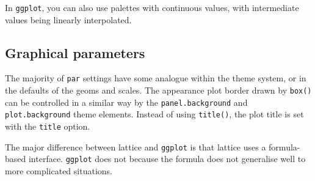 In \texttt{ggplot}, you can also use palettes with continuous values,
with intermediate values being linearly interpolated.

\begin{Shaded}
\begin{Highlighting}[]
\NormalTok{(}\NormalTok{:}\NormalTok{, }\NormalTok{:}\NormalTok{, } \NormalTok{:}\NormalTok{, } \NormalTok{(}\NormalTok{)) +}
\StringTok{  }\NormalTok{(} \NormalTok{(}\NormalTok{))}
\NormalTok{() +}
\StringTok{  }\NormalTok{(} \NormalTok{(}\NormalTok{))}
\end{Highlighting}
\end{Shaded}

\subsection{Graphical parameters}

The majority of \texttt{par} settings have some analogue within the
theme system, or in the defaults of the geoms and scales. The appearance
plot border drawn by \texttt{box()} can be controlled in a similar way
by the \texttt{panel.background} and \texttt{plot.background} theme
elements. Instead of using \texttt{title()}, the plot title is set with
the \texttt{title} option.


The major difference between lattice and \texttt{ggplot} is that lattice
uses a formula-based interface. \texttt{ggplot} does not because the
formula does not generalise well to more complicated situations.

\begin{Shaded}
\begin{Highlighting}[]
\StringTok{ }

\StringTok{ }\StringTok{ }\StringTok{ } 
  \NormalTok{~}\StringTok{ }\StringTok{ }
  \StringTok{ }
\end{Highlighting}
\end{Shaded}

